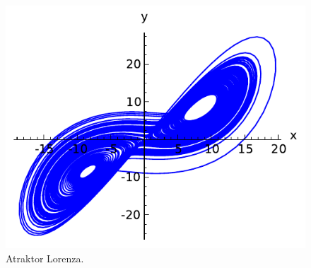\documentclass[a4paper,12pt,polish]{sphinxmanual}
\begin{document}
\begin{figure}[htbp]
\centering
\capstart

\includegraphics{sage_chI024_06.pdf}
\caption{Atraktor Lorenza.}\end{figure}
\end{document}
